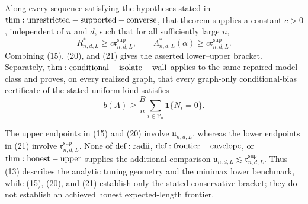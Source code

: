 Along every sequence satisfying the hypotheses stated in \({\rm thm:unrestricted-supported-converse}\), that theorem supplies a constant \(c>0\), independent of \(n\) and \(d\), such that for all sufficiently large \(n\),
\[
 R^*_{n,d,L}\ge c\mathfrak r^{\mathrm{sup}}_{n,d,L},
 \qquad
 \Lambda^*_{n,d,L}(\alpha)
 \ge c\mathfrak r^{\mathrm{sup}}_{n,d,L}.
\tag{21}
\]
Combining (15), (20), and (21) gives the asserted lower--upper bracket.  Separately, \({\rm thm:conditional-isolate-wall}\) applies to the same repaired model class and proves, on every realized graph, that every graph-only conditional-bias certificate of the stated uniform kind satisfies
\[
 b(A)\ge\frac{B}{n}\sum_{i\in\mathcal V_n}\mathbf1\{N_i=0\}.
\tag{22}
\]

The upper endpoints in (15) and (20) involve \(\mathfrak u_{n,d,L}\), whereas the lower endpoints in (21) involve \(\mathfrak r^{\mathrm{sup}}_{n,d,L}\).  None of \({\rm def:radii}\), \({\rm def:frontier-envelope}\), or \({\rm thm:honest-upper}\) supplies the additional comparison \(\mathfrak u_{n,d,L}\lesssim\mathfrak r^{\mathrm{sup}}_{n,d,L}\).  Thus (13) describes the analytic tuning geometry and the minimax lower benchmark, while (15), (20), and (21) establish only the stated conservative bracket; they do not establish an achieved honest expected-length frontier.